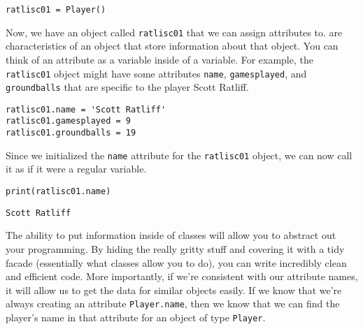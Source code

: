 \begin{lstlisting}[style=pippython]
ratlisc01 = Player()
\end{lstlisting}
Now, we have an object called \verb|ratlisc01| that we can assign attributes to.  are characteristics of an object that store information about that object. You can think of an attribute as a variable inside of a variable. For example, the \verb|ratlisc01| object might have some attributes \verb|name|, \verb|gamesplayed|, and \verb|groundballs| that are specific to the player Scott Ratliff.
\begin{lstlisting}[style=pippython]
ratlisc01.name = 'Scott Ratliff'
ratlisc01.gamesplayed = 9
ratlisc01.groundballs = 19
\end{lstlisting}
Since we initialized the \verb|name| attribute for the \verb|ratlisc01| object, we can now call it as if it were a regular variable.
\begin{lstlisting}[style=pippython]
print(ratlisc01.name)
\end{lstlisting}
\begin{lstlisting}[style=pippython]
Scott Ratliff
\end{lstlisting}
The ability to put information inside of classes will allow you to abstract out your programming. By hiding the really gritty stuff and covering it with a tidy facade (essentially what classes allow you to do), you can write incredibly clean and efficient code. More importantly, if we're consistent with our attribute names, it will allow us to get the data for similar objects easily. If we know that we're always creating an attribute \verb|Player.name|, then we know that we can find the player's name in that attribute for an object of type \verb|Player|.
